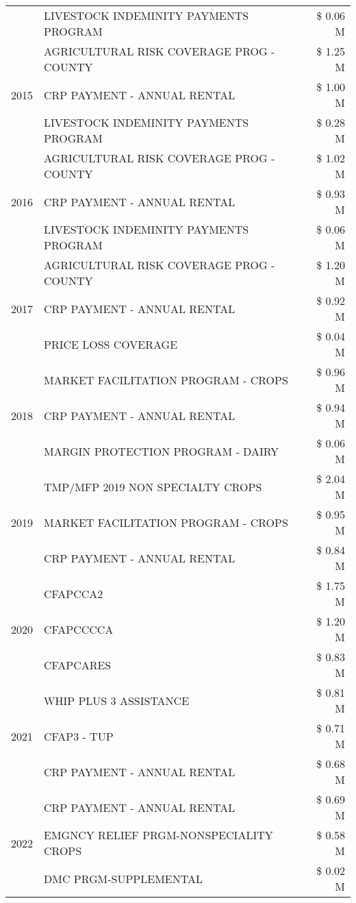 \begin{tabular}{llr}
 & LIVESTOCK INDEMINITY PAYMENTS PROGRAM & \$ 0.06 M \\
\cline{1-3}
\multirow[t]{3}{*}{2015} & AGRICULTURAL RISK COVERAGE PROG - COUNTY & \$ 1.25 M \\
 & CRP PAYMENT - ANNUAL RENTAL & \$ 1.00 M \\
 & LIVESTOCK INDEMINITY PAYMENTS PROGRAM & \$ 0.28 M \\
\cline{1-3}
\multirow[t]{3}{*}{2016} & AGRICULTURAL RISK COVERAGE PROG - COUNTY & \$ 1.02 M \\
 & CRP PAYMENT - ANNUAL RENTAL & \$ 0.93 M \\
 & LIVESTOCK INDEMINITY PAYMENTS PROGRAM & \$ 0.06 M \\
\cline{1-3}
\multirow[t]{3}{*}{2017} & AGRICULTURAL RISK COVERAGE PROG - COUNTY & \$ 1.20 M \\
 & CRP PAYMENT - ANNUAL RENTAL & \$ 0.92 M \\
 & PRICE LOSS COVERAGE & \$ 0.04 M \\
\cline{1-3}
\multirow[t]{3}{*}{2018} & MARKET FACILITATION PROGRAM - CROPS & \$ 0.96 M \\
 & CRP PAYMENT - ANNUAL RENTAL & \$ 0.94 M \\
 & MARGIN PROTECTION PROGRAM - DAIRY & \$ 0.06 M \\
\cline{1-3}
\multirow[t]{3}{*}{2019} & TMP/MFP 2019 NON SPECIALTY CROPS & \$ 2.04 M \\
 & MARKET FACILITATION PROGRAM - CROPS & \$ 0.95 M \\
 & CRP PAYMENT - ANNUAL RENTAL & \$ 0.84 M \\
\cline{1-3}
\multirow[t]{3}{*}{2020} & CFAPCCA2 & \$ 1.75 M \\
 & CFAPCCCCA & \$ 1.20 M \\
 & CFAPCARES & \$ 0.83 M \\
\cline{1-3}
\multirow[t]{3}{*}{2021} & WHIP PLUS 3 ASSISTANCE & \$ 0.81 M \\
 & CFAP3 - TUP & \$ 0.71 M \\
 & CRP PAYMENT - ANNUAL RENTAL & \$ 0.68 M \\
\cline{1-3}
\multirow[t]{3}{*}{2022} & CRP PAYMENT - ANNUAL RENTAL & \$ 0.69 M \\
 & EMGNCY RELIEF PRGM-NONSPECIALITY CROPS & \$ 0.58 M \\
 & DMC PRGM-SUPPLEMENTAL & \$ 0.02 M \\
\cline{1-3}
\bottomrule
\end{tabular}
